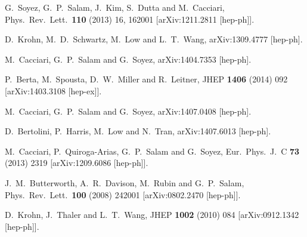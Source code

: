 \documentclass[12pt,a4]{article}
\begin{document}
\begin{thebibliography}{99}
  G.~Soyez, G.~P.~Salam, J.~Kim, S.~Dutta and M.~Cacciari,
  Phys.\ Rev.\ Lett.\  {\bf 110} (2013) 16,  162001
  [arXiv:1211.2811 [hep-ph]].

  D.~Krohn, M.~D.~Schwartz, M.~Low and L.~T.~Wang,
  arXiv:1309.4777 [hep-ph].

  M.~Cacciari, G.~P.~Salam and G.~Soyez,
  arXiv:1404.7353 [hep-ph].

  P.~Berta, M.~Spousta, D.~W.~Miller and R.~Leitner,
  JHEP {\bf 1406} (2014) 092
  [arXiv:1403.3108 [hep-ex]].


  M.~Cacciari, G.~P.~Salam and G.~Soyez,
  arXiv:1407.0408 [hep-ph].

  D.~Bertolini, P.~Harris, M.~Low and N.~Tran,
  arXiv:1407.6013 [hep-ph].


  M.~Cacciari, P.~Quiroga-Arias, G.~P.~Salam and G.~Soyez,
  Eur.\ Phys.\ J.\ C {\bf 73} (2013) 2319
  [arXiv:1209.6086 [hep-ph]].


  J.~M.~Butterworth, A.~R.~Davison, M.~Rubin and G.~P.~Salam,
  Phys.\ Rev.\ Lett.\  {\bf 100} (2008) 242001
  [arXiv:0802.2470 [hep-ph]].

  D.~Krohn, J.~Thaler and L.~T.~Wang,
  JHEP {\bf 1002} (2010) 084
  [arXiv:0912.1342 [hep-ph]].


\end{thebibliography}
\end{document}
